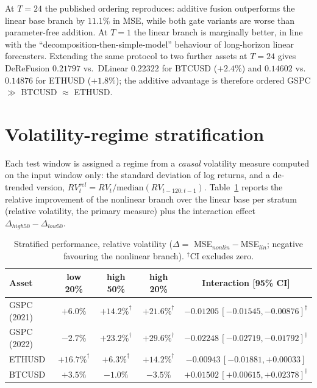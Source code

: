 \documentclass[preprint,12pt]{elsarticle}
\begin{document}
At $T=24$ the published ordering reproduces: additive fusion outperforms the linear base branch
by $11.1\%$ in MSE, while both gate variants are worse than parameter-free addition. At $T=1$
the linear branch is marginally better, in line with the ``decomposition-then-simple-model''
behaviour of long-horizon linear forecasters. Extending the same protocol to two further assets
at $T=24$ gives DeReFusion $0.21797$ vs.\ DLinear $0.22322$ for BTCUSD ($+2.4\%$) and
$0.14602$ vs.\ $0.14876$ for ETHUSD ($+1.8\%$); the additive advantage is therefore ordered
GSPC $\gg$ BTCUSD $\approx$ ETHUSD.

\section{Volatility-regime stratification}
\label{sec:regime}

Each test window is assigned a regime from a \emph{causal} volatility measure computed on the
input window only: the standard deviation of log returns, and a de-trended version,
$RV^{rel}_t = RV_t / \mathrm{median}(RV_{t-120:t-1})$. Table~\ref{tab:regime} reports the
relative improvement of the nonlinear branch over the linear base per stratum (relative
volatility, the primary measure) plus the interaction effect
$\Delta_{high50} - \Delta_{low50}$.

\begin{table}[!t]
\centering
\small
\caption{Stratified performance, relative volatility ($\Delta = $ MSE$_{nonlin}-$MSE$_{lin}$;
negative favouring the nonlinear branch). $^\dagger$CI excludes zero.}
\label{tab:regime}
\begin{tabular}{@{}lcccc@{}}
\toprule
Asset & low 20\% & high 50\% & high 20\% & Interaction [95\% CI] \\
\midrule
GSPC (2021) & $+6.0\%$      & $+14.2\%^\dagger$ & $+21.6\%^\dagger$ & $-0.01205\,[-0.01545,-0.00876]^\dagger$ \\
GSPC (2022) & $-2.7\%$      & $+23.2\%^\dagger$ & $+29.6\%^\dagger$ & $-0.02248\,[-0.02719,-0.01792]^\dagger$ \\
ETHUSD      & $+16.7\%^\dagger$ & $+6.3\%^\dagger$ & $+14.2\%^\dagger$ & $-0.00943\,[-0.01881,+0.00033]$ \\
BTCUSD      & $+3.5\%$      & $-1.0\%$          & $-3.5\%$          & $+0.01502\,[+0.00615,+0.02378]^\dagger$ \\
\bottomrule
\end{tabular}
\end{table}
\end{document}
